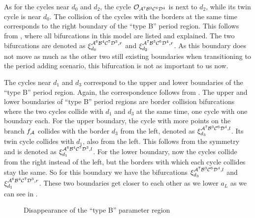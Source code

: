 As for the cycles near $d_0$ and $d_2$, the cycle $\mathcal{O}_{\mathcal{A}^7\mathcal{B}^3\mathcal{C}^6\mathcal{D}^4}$ is next to $d_2$, while its twin cycle is near $d_0$.
The collision of the cycles with the borders at the same time corresponds to the right boundary of the ``type B'' period region.
This follows from , where all bifurcations in this model are listed and explained.
The two bifurcations are denoted as $\xi_{d_0}^{\mathcal{A}^6\mathcal{B}^4\mathcal{C}^7\mathcal{D}^3, r}$ and $\xi_{d_2}^{\mathcal{A}^7\mathcal{B}^3\mathcal{C}^6\mathcal{D}^4, r}$.
As this boundary does not move as much as the other two still existing boundaries when transitioning to the period adding scenario, this bifurcation is not as important to us now.

The cycles near $d_1$ and $d_3$ correspond to the upper and lower boundaries of the ``type B'' period region.
Again, the correspondence follows from .
The upper and lower boundaries of ``type B'' period regions are border collision bifurcations where the two cycles collide with $d_1$ and $d_3$ at the same time, one cycle with one boundary each.
For the upper boundary, the cycle with more points on the branch $f_{\mathcal{A}}$ collides with the border $d_3$ from the left, denoted as $\xi_{d_3}^{\mathcal{A}^7\mathcal{B}^3\mathcal{C}^6\mathcal{D}^4, l}$.
Its twin cycle collides with $d_1$, also from the left.
This follows from the symmetry and is denoted as $\xi_{d_1}^{\mathcal{A}^6\mathcal{B}^4\mathcal{C}^7\mathcal{D}^3, l}$.
For the lower boundary, now the cycles collide from the right instead of the left, but the borders with which each cycle collides stay the same.
So for this boundary we have the bifurcations $\xi_{d_3}^{\mathcal{A}^7\mathcal{B}^3\mathcal{C}^6\mathcal{D}^4, l}$ and $\xi_{d_1}^{\mathcal{A}^6\mathcal{B}^4\mathcal{C}^7\mathcal{D}^3, r}$.
These two boundaries get closer to each other as we lower $a_L$ as we can see in .

\begin{figure}
    \centering
    \label{fig:minrep.just.before.disappearance}
    \caption{Disappearance of the ``type B'' parameter region}
\end{figure}


